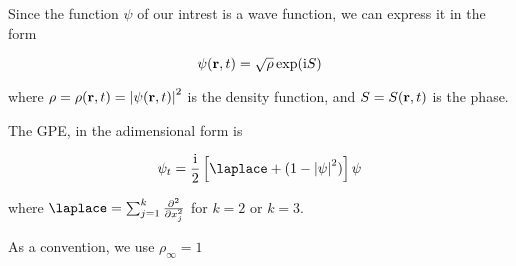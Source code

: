 Since the function $\psi$ of our intrest is a wave function, we can express it in the form 

$$ \psi(\mathbf{r}, t) = \sqrt{\rho} \exp(\mathrm{i} S) $$

where $\rho = \rho(\mathbf{r}, t) = \left| \psi(\mathbf{r}, t) \right|^2$ is the density function, and $S = S(\mathbf{r}, t)$ is the phase.

The GPE, in the adimensional form is

\begin{equation}
    \psi_t = \frac\ii2 \left[\laplace + (1 - \abs{\psi}^2)\right] \psi 
\end{equation}

where $\laplace = \sum_{j = 1}^k \frac{\partial^2}{\partial x_j^2} $ for $k = 2$ or $k = 3$.

As a convention, we use $\rho_\infty = 1$
